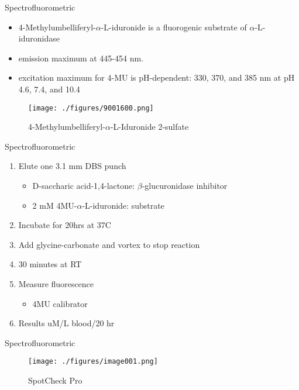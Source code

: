 \documentclass[presentation, smaller]{beamer}
\begin{document}
\begin{frame}[label={sec:orgheadline10}]{Spectrofluorometric}
\begin{itemize}
\item 4-Methylumbelliferyl-\(\alpha\)-L-iduronide is a fluorogenic substrate of \(\alpha\)-L-iduronidase
\item emission maximum at 445-454 nm.
\item excitation maximum for 4-MU is pH-dependent: 330, 370, and 385 nm at pH 4.6, 7.4, and 10.4
\end{itemize}

\begin{figure}[htb]
\centering
\texttt{[image: ./figures/9001600.png]}
\caption[4MUI]{\label{fig:4mui}
4-Methylumbelliferyl-\(\alpha\)-L-Iduronide 2-sulfate}
\end{figure}
\end{frame}


\begin{frame}[label={sec:orgheadline11}]{Spectrofluorometric}
\begin{enumerate}
\item Elute one 3.1 mm DBS punch
\begin{itemize}
\item D-saccharic acid-1,4-lactone: \(\beta\)-glucuronidase inhibitor
\item 2 mM 4MU-\(\alpha\)-L-iduronide: substrate
\end{itemize}
\item Incubate for 20hrs at 37\degree C
\item Add glycine-carbonate and vortex to stop reaction
\item 30 minutes at RT
\item Measure fluorescence
\begin{itemize}
\item 4MU calibrator
\end{itemize}
\item Results uM/L blood/20 hr
\end{enumerate}
\end{frame}


\begin{frame}[label={sec:orgheadline12}]{Spectrofluorometric}
\begin{figure}[htb]
\centering
\texttt{[image: ./figures/image001.png]}
\caption{\label{fig:ap}
SpotCheck Pro}
\end{figure}
\end{frame}
\end{document}
